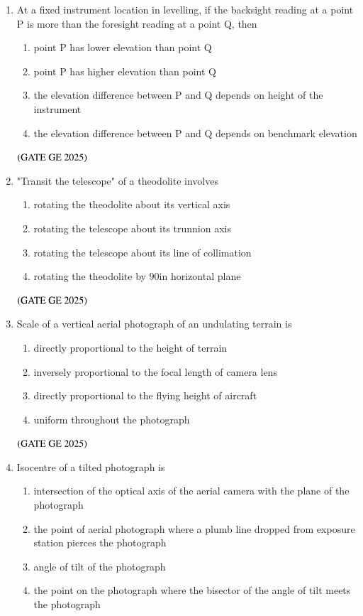 \documentclass[journal,12pt,onecolumn]{IEEEtran}
\theoremstyle{remark}
\begin{document}
\begin{enumerate}
\bigskip
\item At a fixed instrument location in levelling, if the backsight reading at a point 
P is more than the foresight reading at a point Q, then
\begin{enumerate}
\item point P has lower elevation than point Q
\item point P has higher elevation than point Q
\item the elevation difference between P and Q depends on height of the instrument
\item the elevation difference between P and Q depends on benchmark elevation
\end{enumerate}
\hfill $\left(\text{GATE GE 2025}\right)$
\bigskip
\item "Transit the telescope" of a theodolite involves
\begin{enumerate}
\item rotating the theodolite about its vertical axis
\item rotating the telescope about its trunnion axis
\item rotating the telescope about its line of collimation
\item rotating the theodolite by $90$\degree in horizontal plane
\end{enumerate}
\hfill $\left(\text{GATE GE 2025}\right)$
\bigskip
\item Scale of a vertical aerial photograph of 
an undulating terrain is
\begin{enumerate}
\item directly proportional to the height of terrain
\item inversely proportional to the focal length of camera lens
\item directly proportional to the flying height of aircraft
\item uniform throughout the photograph
\end{enumerate}
\hfill $\left(\text{GATE GE 2025}\right)$
\bigskip
\item Isocentre of a tilted photograph is
\begin{enumerate}
\item intersection of the optical axis of the aerial camera with the plane of the photograph
\item the point of aerial photograph where a plumb line dropped from exposure station pierces the photograph
\item angle of tilt of the photograph
\item the point on the photograph where the bisector of the angle of tilt meets the photograph
\end{enumerate}
\end{enumerate}
\end{document}
